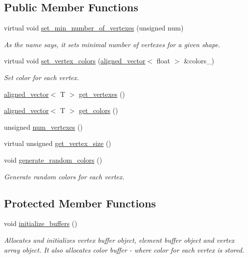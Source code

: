 \subsection*{Public Member Functions}
\begin{DoxyCompactItemize}
\item 
virtual void \mbox{\hyperlink{classShape_ac5a35fe1b2ecb8fcfc050a31c8969805}{set\+\_\+min\+\_\+number\+\_\+of\+\_\+vertexes}} (unsigned num)
\begin{DoxyCompactList}\small\item\em As the name says, it sets minimal number of vertexes for a given shape. \end{DoxyCompactList}\item 
virtual void \mbox{\hyperlink{classShape_a69dabd50440dba1ac463ad6819cdb506}{set\+\_\+vertex\+\_\+colors}} (\mbox{\hyperlink{type__definitions_8hpp_a087efd587d66b881646ef378f1919c90}{aligned\+\_\+vector}}$<$ float $>$ \&colors\+\_\+)
\begin{DoxyCompactList}\small\item\em Set color for each vertex. \end{DoxyCompactList}\item 
\mbox{\hyperlink{type__definitions_8hpp_a087efd587d66b881646ef378f1919c90}{aligned\+\_\+vector}}$<$ T $>$ \mbox{\hyperlink{classShape_a3729bbdd0c4e4f3379498734807bb545}{get\+\_\+vertexes}} ()
\item 
\mbox{\hyperlink{type__definitions_8hpp_a087efd587d66b881646ef378f1919c90}{aligned\+\_\+vector}}$<$ T $>$ \mbox{\hyperlink{classShape_aabe9bd208b0ece9824cb45deccc11ba7}{get\+\_\+colors}} ()
\item 
unsigned \mbox{\hyperlink{classShape_a131e85c7f5cad85bffb92e6719117cab}{num\+\_\+vertexes}} ()
\item 
virtual unsigned \mbox{\hyperlink{classShape_a58713d8cf7c4175e7c76eae75c94bc13}{get\+\_\+vertex\+\_\+size}} ()
\item 
void \mbox{\hyperlink{classShape_aabeb601fe95b412987d5b5c276bf8a7a}{generate\+\_\+random\+\_\+colors}} ()
\begin{DoxyCompactList}\small\item\em Generate random colors for each vertex. \end{DoxyCompactList}\end{DoxyCompactItemize}
\subsection*{Protected Member Functions}
\begin{DoxyCompactItemize}
\item 
void \mbox{\hyperlink{classShape_a8b4f54a694871f9d131fdd105e1ca709}{initialize\+\_\+buffers}} ()
\begin{DoxyCompactList}\small\item\em Allocates and initializes vertex buffer object, element buffer object and vertex array object. It also allocates color buffer -\/ where color for each vertex is stored. \end{DoxyCompactList}\end{DoxyCompactItemize}
